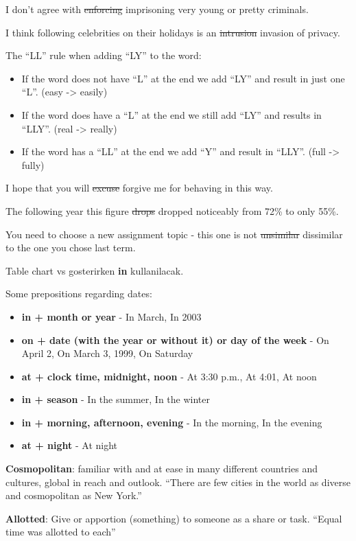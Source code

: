 \documentclass[12pt, a4paper]{ximera}
\begin{document}
I don't agree with \sout{enforcing} imprisoning very young or pretty criminals.

I think following celebrities on their holidays is an \sout{intrusion} invasion of privacy.

The ``LL'' rule when adding ``LY'' to the word:
\begin{itemize}
    \item If the word does not have ``L'' at the end we add ``LY'' and result in just one ``L''. (easy -> easily)
    \item If the word does have a ``L'' at the end we still add ``LY'' and results in ``LLY''. (real -> really)
    \item If the word has a ``LL'' at the end we add ``Y'' and result in ``LLY''. (full -> fully)
\end{itemize}

I hope that you will \sout{excuse} forgive me for behaving in this way.

The following year this figure \sout{drops} dropped noticeably from 72\% to only 55\%.

You need to choose a new assignment topic - this one is not \sout{unsimilar} dissimilar to the one you chose last term.

Table chart vs gosterirken \textbf{in} kullanilacak.

Some prepositions regarding dates:
\begin{itemize}
    \item \textbf{in + month or year} - In March, In 2003
    \item \textbf{on + date (with the year or without it) or day of the week} - On April 2, On March 3, 1999, On Saturday
    \item \textbf{at + clock time, midnight, noon} - At 3:30 p.m., At 4:01, At noon
    \item \textbf{in + season} - In the summer, In the winter
    \item \textbf{in + morning, afternoon, evening} - In the morning, In the evening
    \item \textbf{at + night} - At night
\end{itemize}

\textbf{Cosmopolitan}: familiar with and at ease in many different countries and cultures, global in reach and outlook. ``There are few cities in the world as diverse and cosmopolitan as New York.''

\textbf{Allotted}: Give or apportion (something) to someone as a share or task. ``Equal time was allotted to each''
\end{document}
